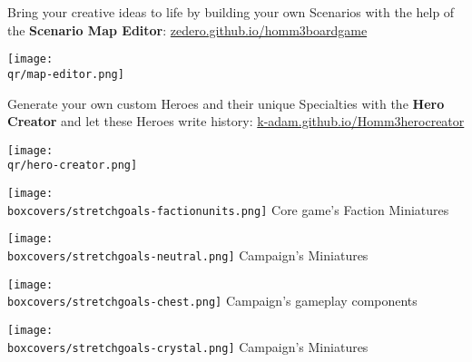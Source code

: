 \begin{multicols}{2}
\begin{itemize}
    \begin{minipage}{5cm}
        \item Bring your creative ideas to life by building your own Scenarios with the help of the \textbf{Scenario Map Editor}:
        {\footnotesize \href{https://zedero.github.io/homm3boardgame/}{zedero.github.io/homm3boardgame}}
    \end{minipage}
    \hfill
    \begin{minipage}{2cm}
        \begin{center}
            \texttt{[image: \\qr/map-editor.png]}
            \scriptsize {}
        \end{center}
    \end{minipage}\par
    \smallskip
    \begin{minipage}{5cm}
    \item Generate your own custom Heroes and their unique Specialties with the \textbf{Hero Creator} and let these Heroes write history:
      \mbox{\footnotesize \href{https://k-adam.github.io/Homm3_hero_creator}{k-adam.github.io/Homm3\textunderscore{}hero\textunderscore{}creator}}
    \end{minipage}
    \hfill
    \begin{minipage}{2cm}
        \begin{center}
            \texttt{[image: \\qr/hero-creator.png]}
            \scriptsize {}
        \end{center}
    \end{minipage}\par
  \end{itemize}
\end{multicols}
\begin{multicols}{4}
    \begin{center}
        \texttt{[image: \\boxcovers/stretchgoals-factionunits.png]}\newline
        \footnotesize Core game's Faction Miniatures\par
        \columnbreak
        \texttt{[image: \\boxcovers/stretchgoals-neutral.png]}\newline
        \footnotesize {} Campaign's Miniatures\par
        \columnbreak
        \texttt{[image: \\boxcovers/stretchgoals-chest.png]}\newline
        \footnotesize {} Campaign's gameplay components\par
        \columnbreak
        \texttt{[image: \\boxcovers/stretchgoals-crystal.png]}\newline
        \footnotesize {} Campaign's Miniatures\par
    \end{center}
\end{multicols}
